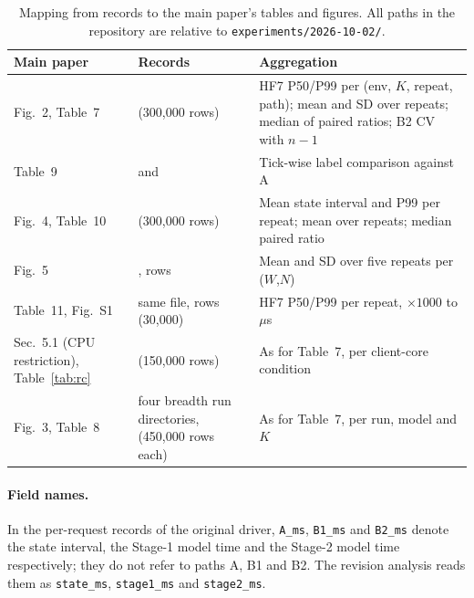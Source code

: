 \documentclass[10pt,a4paper]{article}
\begin{document}
\begin{table}[h]
\centering\small
\caption{Mapping from records to the main paper's tables and figures. All paths in the repository are relative to \texttt{experiments/2026-10-02/}.}\label{tab:map}
\begin{tabularx}{\linewidth}{@{}lYY@{}}
\toprule
Main paper & Records & Aggregation \\
\midrule
Fig.~2, Table~7 &  (300,000 rows) & HF7 P50/P99 per (env, $K$, repeat, path); mean and SD over repeats; median of paired ratios; B2 CV with $n-1$ \\
Table~9 &  and  & Tick-wise label comparison against A \\
Fig.~4, Table~10 &  (300,000 rows) & Mean state interval and P99 per repeat; mean over repeats; median paired ratio \\
Fig.~5 & ,  rows & Mean and SD over five repeats per ($W$,$N$) \\
Table~11, Fig.~S1 & same file,  rows (30,000) & HF7 P50/P99 per repeat, $\times1000$ to $\mu$s \\
Sec.~5.1 (CPU restriction), Table~\ref{tab:rc} &  (150,000 rows) & As for Table~7, per client-core condition \\
Fig.~3, Table~8 & four breadth run directories,  (450,000 rows each) & As for Table~7, per run, model and $K$ \\
\bottomrule
\end{tabularx}
\end{table}

\paragraph{Field names.} In the per-request records of the original driver, \texttt{A\_ms}, \texttt{B1\_ms} and \texttt{B2\_ms} denote the state interval, the Stage-1 model time and the Stage-2 model time respectively; they do not refer to paths A, B1 and B2. The revision analysis reads them as \texttt{state\_ms}, \texttt{stage1\_ms} and \texttt{stage2\_ms}.
\end{document}
